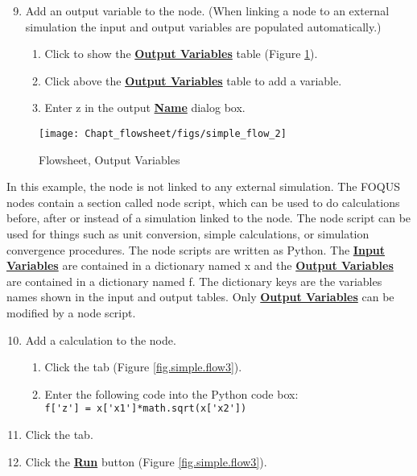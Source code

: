 \begin{enumerate}
	\setcounter{enumi}{8}
	\item Add an output variable to the node. (When linking a node to an external simulation the input and output variables are populated automatically.)
	\begin{enumerate}
		\item Click  to show the \textbf{\underline{Output Variables}} table (Figure \ref{fig.simple.flow2}).
		\item Click \bu{+} above the \textbf{\underline{Output Variables}} table to add a variable.
		\item Enter z in the output \textbf{\underline{Name}} dialog box.
	\end{enumerate}
\end{enumerate}

\begin{figure}[H]
	\begin{center}
		\texttt{[image: Chapt\_flowsheet/figs/simple\_flow\_2]}
		\caption{Flowsheet, Output Variables}
		\label{fig.simple.flow2}
	\end{center}
\end{figure}

In this example, the node is not linked to any external simulation. The FOQUS nodes contain a section called node script, which can be used to do calculations before, after or instead of a simulation linked to the node. The node script can be used for things such as unit conversion, simple calculations, or simulation convergence procedures. The node scripts are written as Python. The \textbf{\underline{Input Variables}} are contained in a dictionary named x and the \textbf{\underline{Output Variables}} are contained in a dictionary named f. The dictionary keys are the variables names shown in the input and output tables. Only \textbf{\underline{Output Variables}} can be modified by a node script.

\begin{enumerate}
	\setcounter{enumi}{9}
	\item Add a calculation to the node.
	\begin{enumerate}
		\item Click the  tab (Figure \ref{fig.simple.flow3}).
		\item Enter the following code into the Python code box: \\ \verb|f['z'] = x['x1']*math.sqrt(x['x2'])|
	\end{enumerate}
	\item Click the  tab.
	\item Click the \textbf{\underline{Run}} button (Figure \ref{fig.simple.flow3}).
\end{enumerate}

